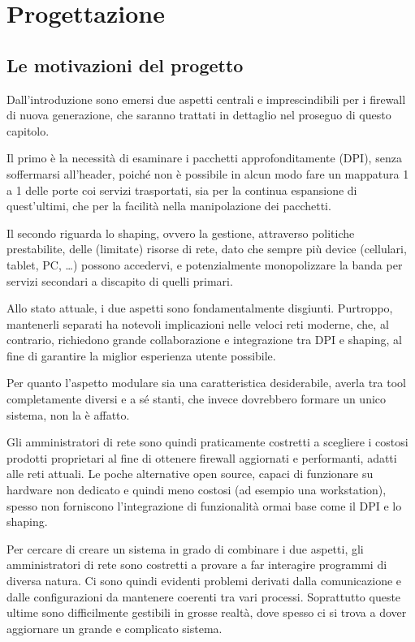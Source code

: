 \clearpage{\pagestyle{empty}\cleardoublepage}
\chapter{Progettazione}

\section{Le motivazioni del progetto}

Dall'introduzione sono emersi due aspetti centrali e imprescindibili per i firewall di nuova generazione, che saranno trattati in dettaglio nel proseguo di questo capitolo.

Il primo è la necessità di esaminare i pacchetti approfonditamente (DPI), senza soffermarsi all'header, poiché non è possibile in alcun modo fare un mappatura 1 a 1 delle porte coi servizi trasportati, sia per la continua espansione di quest'ultimi, che per la facilità nella manipolazione dei pacchetti.

Il secondo riguarda lo shaping, ovvero la gestione, attraverso politiche prestabilite, delle (limitate) risorse di rete, dato che sempre più device (cellulari, tablet, PC, \dots) possono accedervi, e potenzialmente monopolizzare la banda per servizi secondari a discapito di quelli primari.

Allo stato attuale, i due aspetti sono fondamentalmente disgiunti. Purtroppo, mantenerli separati ha notevoli implicazioni nelle veloci reti moderne, che, al contrario, richiedono grande collaborazione e integrazione tra DPI e shaping, al fine di garantire la miglior esperienza utente possibile.

Per quanto l'aspetto modulare sia una caratteristica desiderabile, averla tra tool completamente diversi e a sé stanti, che invece dovrebbero formare un unico sistema, non la è affatto.

Gli amministratori di rete sono quindi praticamente costretti a scegliere i costosi prodotti proprietari al fine di ottenere firewall aggiornati e performanti, adatti alle reti attuali. Le poche alternative open source, capaci di funzionare su hardware non dedicato e quindi meno costosi (ad esempio una workstation), spesso non forniscono l'integrazione di funzionalità ormai base come il DPI e lo shaping.

Per cercare di creare un sistema in grado di combinare i due aspetti, gli amministratori di rete sono costretti a provare a far interagire programmi di diversa natura. Ci sono quindi evidenti problemi derivati dalla comunicazione e dalle configurazioni da mantenere coerenti tra vari processi. Soprattutto queste ultime sono difficilmente gestibili in grosse realtà, dove spesso ci si trova a dover aggiornare un grande e complicato sistema.

